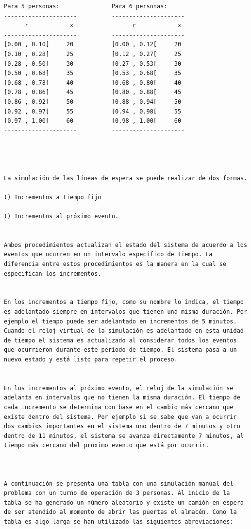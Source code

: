 \begin{verbatim}
Para 5 personas:               Para 6 personas:
---------------------          ---------------------
      r            x                 r            x
---------------------          ---------------------
[0.00 , 0.10[     20           [0.00 , 0.12[     20
[0.10 , 0.28[     25           [0.12 , 0.27[     25
[0.28 , 0.50[     30           [0.27 , 0.53[     30
[0.50 , 0.68[     35           [0.53 , 0.68[     35
[0.68 , 0.78[     40           [0.68 , 0.80[     40
[0.78 , 0.86[     45           [0.80 , 0.88[     45
[0.86 , 0.92[     50           [0.88 , 0.94[     50
[0.92 , 0.97[     55           [0.94 , 0.98[     55
[0.97 , 1.00[     60           [0.98 , 1.00[     60
---------------------          ---------------------




La simulación de las líneas de espera se puede realizar de dos formas.

() Incrementos a tiempo fijo

() Incrementos al próximo evento.


Ambos procedimientos actualizan el estado del sistema de acuerdo a los eventos que ocurren en un intervalo específico de tiempo. La diferencia entre estos procedimientos es la manera en la cual se especifican los incrementos.


En los incrementos a tiempo fijo, como su nombre lo indica, el tiempo es adelantado siempre en intervalos que tienen una misma duración. Por ejemplo el tiempo puede ser adelantado en incrementos de 5 minutos. Cuando el reloj virtual de la simulación es adelantado en esta unidad de tiempo el sistema es actualizado al considerar todos los eventos que ocurrieron durante este período de tiempo. El sistema pasa a un nuevo estado y está listo para repetir el proceso.


En los incrementos al próximo evento, el reloj de la simulación se adelanta en intervalos que no tienen la misma duración. El tiempo de cada incremento se determina con base en el cambio más cercano que existe dentro del sistema. Por ejemplo si se sabe que van a ocurrir dos cambios importantes en el sistema uno dentro de 7 minutos y otro dentro de 11 minutos, el sistema se avanza directamente 7 minutos, al tiempo más cercano del próximo evento que está por ocurrir.



A continuación se presenta una tabla con una simulación manual del problema con un turno de operación de 3 personas. Al inicio de la tabla se ha generado un número aleatorio y existe un camión en espera de ser atendido al momento de abrir las puertas el almacén. Como la tabla es algo larga se han utilizado las siguientes abreviaciones:


\end{verbatim}
